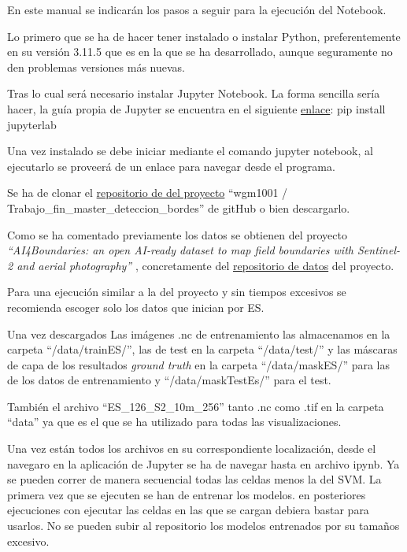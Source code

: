 En este manual se indicarán los pasos a seguir para la ejecución del Notebook.

Lo primero que se ha de hacer tener instalado o instalar Python, preferentemente en su versión 3.11.5 que es en la que se ha desarrollado, aunque seguramente no den problemas versiones más nuevas.

Tras lo cual será necesario instalar Jupyter Notebook. La forma sencilla sería hacer, la guía propia de Jupyter se encuentra en el siguiente \href{https://jupyter.org/install}{enlace}:
pip install jupyterlab

Una vez instalado se debe iniciar mediante el comando jupyter notebook, al ejecutarlo se proveerá de un enlace para navegar desde el programa. 

Se ha de clonar el \href{https://github.com/wgm1001/Trabajo_fin_master_deteccion_bordes}{repositorio de del proyecto} ``wgm1001 / Trabajo\_fin\_master\_deteccion\_bordes'' de gitHub o bien descargarlo.

Como se ha comentado previamente los datos se obtienen del proyecto \textit{``AI4Boundaries: an open AI-ready dataset to map field boundaries with Sentinel-2 and aerial photography''} \cite{AI4boundaries}, concretamente del  \href{https://jeodpp.jrc.ec.europa.eu/ftp/jrc-opendata/DRLL/AI4BOUNDARIES/sentinel2/}{repositorio de datos} del proyecto.

Para una ejecución similar a la del proyecto y sin tiempos excesivos se recomienda escoger solo los datos que inician por ES.

Una vez descargados Las imágenes .nc de entrenamiento las almacenamos en la carpeta ``/data/trainES/'', las de test en la carpeta ``/data/test/'' y las máscaras de capa de los resultados \textit{ground truth} en la carpeta ``/data/maskES/'' para las de los datos de entrenamiento y ``/data/maskTestEs/'' para el test.

También el archivo ``ES\_126\_S2\_10m\_256'' tanto .nc como .tif en la carpeta ``data'' ya que es el que se ha utilizado para todas las visualizaciones.

Una vez están todos los archivos en su correspondiente localización, desde el navegaro en la aplicación de Jupyter se ha de navegar hasta en archivo ipynb. Ya se pueden correr de manera secuencial todas las celdas menos la del SVM. La primera vez que se ejecuten se han de entrenar los modelos. en posteriores ejecuciones con ejecutar las celdas en las que se cargan debiera bastar para usarlos. No se pueden subir al repositorio los modelos entrenados  por su tamaños excesivo.